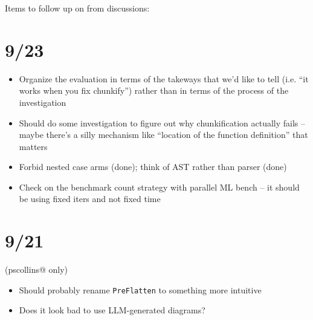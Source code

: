 
Items to follow up on from discussions:

\section{9/23}

\begin{itemize}
\item Organize the evaluation in terms of the takeways that we'd like to tell
  (i.e. ``it works when you fix chunkify'') rather than in terms of the process
  of the investigation
\item Should do some investigation to figure out why chunkification actually
  fails -- maybe there's a silly mechanism like ``location of the function
  definition'' that matters
\item Forbid nested case arms (done); think of AST rather than parser (done)
\item Check on the benchmark count strategy with parallel ML bench -- it should
  be using fixed iters and not fixed time
\end{itemize}

\section{9/21}

(pscollins@ only)

\begin{itemize}
\item Should probably rename \texttt{PreFlatten} to something more intuitive
\item Does it look bad to use LLM-generated diagrams?
\end{itemize}

